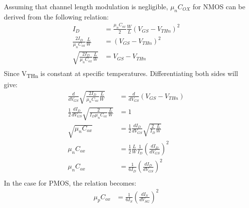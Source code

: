 \documentclass{article}
\begin{document}
\begin{enumerate}
Assuming that channel length modulation is negligible, \(\mu_{n}C_{OX}\) for NMOS can be derived
from the following relation:
\begin{equation*}
\begin{aligned}
I_{D} &= \frac{\mu_{n}C_{ox}}{2} \frac{W}{L} (V_{GS} - V_{THn})^2 \\
\frac{2 I_{D}}{\mu_{n}C_{ox}}\frac{L}{W} &=  (V_{GS} - V_{THn})^2 \\
\sqrt{\frac{2 I_{D}}{\mu_{n}C_{ox}}\frac{L}{W}} &=  V_{GS} - V_{THn} \\
\end{aligned}
\end{equation*}
Since V\textsubscript{THn} is constant at specific temperatures.
Differentiating both sides will give:
\begin{equation*}
\begin{aligned}
\frac{d}{dV_{GS}}\sqrt{\frac{2 I_{D}}{\mu_{n}C_{ox}}\frac{L}{W}} &=  \frac{d}{dV_{GS}}(V_{GS} - V_{THn}) \\
\frac{1}{2} \frac{dI_{D}}{dV_{GS}} \sqrt{\frac{2}{I_{D}\mu_{n}C_{ox}}\frac{L}{W}} &=  1 \\
\sqrt{\mu_{n}C_{ox}} &= \frac{1}{2} \frac{dI_{D}}{dV_{GS}} \sqrt{\frac{2}{I_{D}}\frac{L}{W}} \\
\mu_{n}C_{ox} &= \frac{1}{2} \frac{L}{W} \frac{1}{I_{D}}(\frac{dI_{D}}{dV_{GS}})^{2} \\
\mu_{n}C_{ox} &= \frac{1}{6 I_{D}}(\frac{dI_{D}}{dV_{GS}})^{2} \\
\end{aligned}
\end{equation*}
In the case for PMOS, the relation becomes:
\begin{equation*}
\begin{aligned}
\mu_{p}C_{ox} &= \frac{1}{6 I_{S}}(\frac{dI_{S}}{dV_{SG}})^{2} \\
\end{aligned}
\end{equation*}


\end{enumerate}
\end{document}
